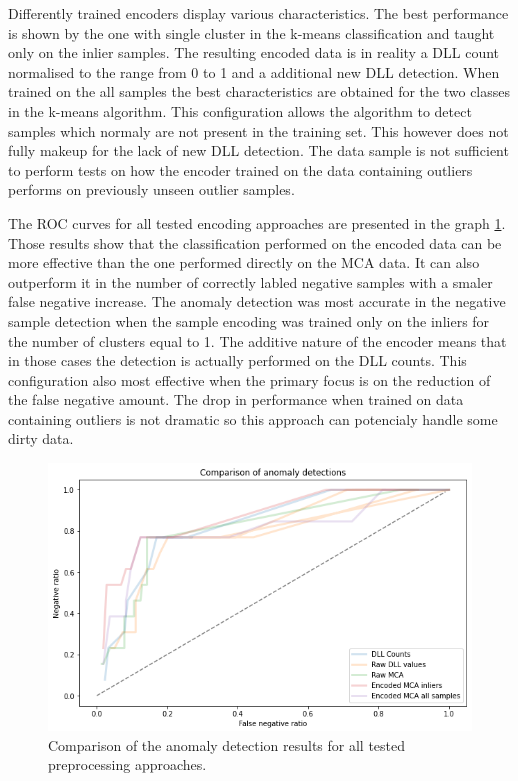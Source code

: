 \documentclass[a4paper,twoside,12pt]{book}
\begin{document}
Differently trained encoders display various characteristics. The best performance is shown by
the one with single cluster in the k-means classification and taught only on the inlier samples.
The resulting encoded data is in reality a DLL count normalised to the range from 0 to 1 and a
additional new DLL detection. When trained on the all samples the best characteristics are 
obtained for the two classes in the k-means algorithm. This configuration allows the algorithm
to detect samples which normaly are not present in the training set. This however does not 
fully makeup for the lack of new DLL detection. The data sample is not sufficient to perform
tests on how the encoder trained on the data containing outliers performs on previously unseen
outlier samples.

The ROC curves for all tested encoding approaches are presented in the graph \ref{fig:GraphComp}.
Those results show that the classification performed on the encoded data can be more effective
than the one performed directly on the MCA data. It can also outperform it in the number of 
correctly labled negative samples with a smaler false negative increase. The anomaly 
detection was most accurate in the negative sample detection when the sample encoding was trained only on the inliers
for the number of clusters equal to 1. The additive nature of the encoder means that in those cases the 
detection is actually performed on the DLL counts. This configuration also most effective 
when the primary focus is on the reduction of the false negative amount. The drop in performance when 
trained on data containing outliers is not dramatic so this approach can potencialy handle some 
dirty data.

\begin{figure}
	\centering
	\includegraphics[scale=0.9]{images/DLLCompGraphKF.PNG}
	\caption{Comparison of the anomaly detection results for all tested preprocessing approaches.}
	\label{fig:GraphComp}
 \end{figure}
\end{document}
